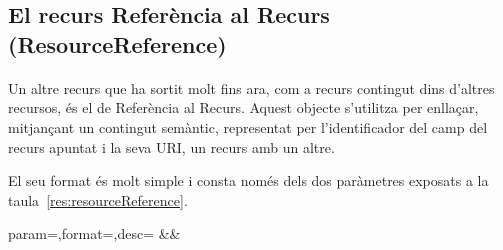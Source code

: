\subsection{El recurs Referència al Recurs (ResourceReference)}

    \paragraph{}
    Un altre recurs que ha sortit molt fins ara, com a recurs contingut dins d'altres recursos, és el de Referència al Recurs. Aquest objecte s'utilitza per enllaçar, mitjançant un contingut semàntic, representat per l'identificador del camp del recurs apuntat i la seva URI, un recurs amb un altre.

    El seu format és molt simple i consta només dels dos paràmetres exposats a la taula~\ref{res:resourceReference}.

    \begin{center}
             {param=\param,format=\format,desc=\desc}
             {\param&\format&\desc}
     \end{center}
